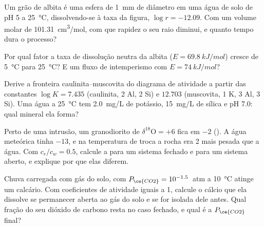 \begin{exercise}[$\star\star$]\label{exo:b3:water-rock-interaction:7}
Um grão de albita é uma esfera de \qty{1}{mm} de diâmetro em uma água de solo
de pH 5 a \qty{25}{\celsius}, dissolvendo-se à taxa da figura, $\log r = -12.09$.
Com um volume molar de \qty{101.31}{cm^3/mol}, com que rapidez o seu raio
diminui, e quanto tempo dura o processo?
\end{exercise}

\begin{exercise}[$\star\star$]\label{exo:b3:water-rock-interaction:8}
Por qual fator a taxa de dissolução neutra da albita ($E =
\qty{69.8}{kJ/mol}$) cresce de \qty{5}{\celsius} para \qty{25}{\celsius}? E
um fluxo de intemperismo com $E = \qty{74}{kJ/mol}$?
\end{exercise}

\begin{exercise}[$\star\star$]\label{exo:b3:water-rock-interaction:9}
Derive a fronteira caulinita--muscovita do diagrama de atividade a partir das
constantes $\log K = 7.435$ (caulinita, 2 Al, 2 Si) e $12.703$ (muscovita, 1
K, 3 Al, 3 Si). Uma água a \qty{25}{\celsius} tem \qty{2.0}{mg/L} de potássio,
\qty{15}{mg/L} de sílica e pH 7.0: qual mineral ela forma?
\end{exercise}

\begin{exercise}[$\star\star\star$]\label{exo:b3:water-rock-interaction:10}
Perto de uma intrusão, um granodiorito de $\delta^{18}\mathrm O = +6$
fica em $-2$ (\unit{\permil}). A água meteórica tinha $-13$, e na temperatura
de troca a rocha era \qty{2}{\permil} mais pesada que a água. Com $c_r/c_w = 0.5$,
calcule a  para um sistema fechado e
para um sistema aberto, e explique por que elas diferem.
\end{exercise}

\begin{exercise}[$\star\star\star$]\label{exo:b3:water-rock-interaction:11}
Chuva carregada com gás do solo, com $P_{\ce{CO2}} = 10^{-1.5}$~atm a
\qty{10}{\celsius} atinge um calcário. Com coeficientes de atividade iguais a 1,
calcule o cálcio que ela dissolve se permanecer aberta ao gás do solo e se for
isolada dele antes. Qual fração do seu dióxido de carbono resta no
caso fechado, e qual é a $P_{\ce{CO2}}$ final?
\end{exercise}


